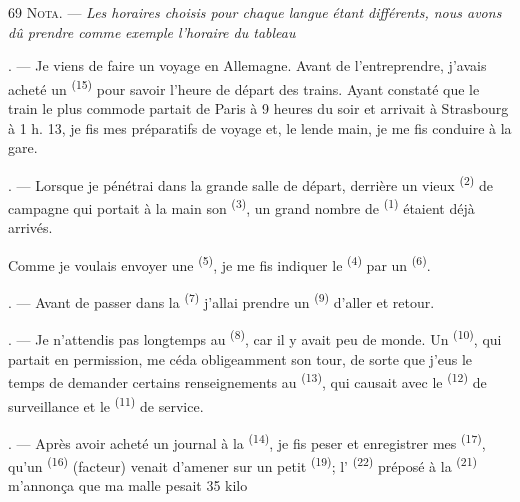 \begin{VUpage}[71]{69}
\VUsaut{4.0mm}
\VUsaut{2.4mm}
\VUsaut{2.0mm}
\VUornamento{9pt}
\VUsaut{2.0mm}
\VUsaut{3.4mm}
\VUblancAlinea
\textsc{Nota.} --- \textit{Les horaires choisis pour chaque langue}\nl
\textit{étant différents, nous avons dû prendre comme}\nl
\textit{exemple l'horaire du tableau} 

. --- Je viens de faire un voyage en Allemagne.\nl
Avant de l'entreprendre, j'avais acheté un \cc
{} \textsuperscript{(15)} pour savoir l'heure de départ des trains.\nl
Ayant constaté que le train le plus commode partait\nl
de Paris à 9 heures du soir et arrivait à Strasbourg\nl
à 1 h. 13, je fis mes préparatifs de voyage et, le lende\cc
main, je me fis conduire à la gare.

. --- Lorsque je pénétrai dans la grande salle de\nl
départ, derrière un vieux  \textsuperscript{(2)} de campagne\nl
qui portait à la main son  \textsuperscript{(3)}, un grand\nl
nombre de  \textsuperscript{(1)} étaient déjà arrivés.

\VUblancAlinea
Comme je voulais envoyer une \cc
{} \textsuperscript{(5)}, je me fis indiquer le \cc
{} \textsuperscript{(4)} par un  \textsuperscript{(6)}.

. --- Avant de passer dans la  \textsuperscript{(7)}\nl
j'allai prendre un \textsuperscript{(9)} d'aller et retour.

. --- Je n'attendis pas longtemps au  \textsuperscript{(8)},\nl
car il y avait peu de monde. Un  \textsuperscript{(10)}, qui\nl
partait en permission, me céda obligeamment son\nl
tour, de sorte que j'eus le temps de demander certains\nl
renseignements au  \textsuperscript{(13)}, qui causait avec\nl
le  \textsuperscript{(12)} de surveillance et le \cc
{} \textsuperscript{(11)} de service.

. --- Après avoir acheté un journal à la \cc
{}\textsuperscript{(14)}, je fis peser et enregistrer mes \textsuperscript{(17)},\nl
qu'un  \textsuperscript{(16)} (facteur) venait d'amener sur un\nl
petit  \textsuperscript{(19)}; l' \textsuperscript{(22)} préposé à la \cc
{} \textsuperscript{(21)} m'annonça que ma malle pesait 35 kilo
\parplein
\end{VUpage}

